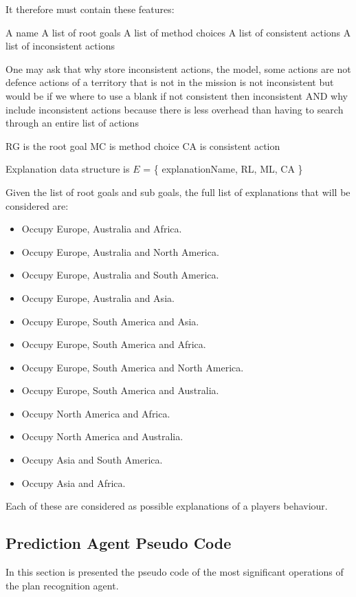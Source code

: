 \documentclass[parskip]{cs4rep}
\begin{document}
It therefore must contain these features:

A name
A list of root goals
A list of method choices
A list of consistent actions
A list of inconsistent actions

One may ask that why store inconsistent actions, the model, some actions are not defence actions of a territory that is not in the mission is not inconsistent but would be if we where to use a blank if not consistent then inconsistent AND why include inconsistent actions because there is less overhead than having to search through an entire list of actions

RG is the root goal
MC is method choice
CA is consistent action

Explanation data structure is $E$ = \{ explanationName, RL, ML, CA \}

Given the list of root goals and sub goals, the full list of explanations that will be considered are:

\begin{itemize}
\item
Occupy Europe, Australia and Africa.
\item
Occupy Europe, Australia and North America.
\item
Occupy Europe, Australia and South America.
\item
Occupy Europe, Australia and Asia.
\item
Occupy Europe, South America and Asia.
\item
Occupy Europe, South America and Africa.
\item
Occupy Europe, South America and North America.
\item
Occupy Europe, South America and Australia.
\item
Occupy North America and Africa.
\item
Occupy North America and Australia.
\item
Occupy Asia and South America.
\item
Occupy Asia and Africa.
\newline
\end{itemize}

Each of these are considered as possible explanations of a players behaviour.

\subsection{Prediction Agent Pseudo Code}

In this section is presented the pseudo code of the most significant operations of the plan recognition agent.
\end{document}
